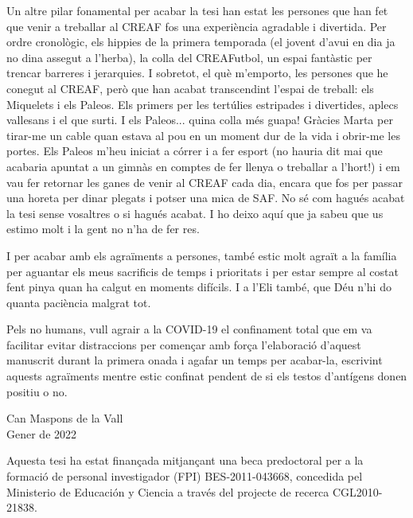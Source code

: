 \documentclass[12pt,a4paper,twoside,fleqn]{memoir}
\begin{document}
Un altre pilar fonamental per acabar la tesi han estat les persones que han fet
que venir a treballar al CREAF fos una experiència agradable i divertida. Per
ordre cronològic, els hippies de la primera temporada (el jovent d'avui en dia
ja no dina assegut a l'herba), la colla del CREAFutbol, un espai fantàstic per
trencar barreres i jerarquies. I sobretot, el què m'emporto, les persones que he
conegut al CREAF, però que han acabat transcendint l'espai de treball: els
Miquelets i els Paleos. Els primers per les tertúlies estripades i divertides,
aplecs vallesans i el que surti. I els Paleos... quina colla més guapa! Gràcies
Marta per tirar-me un cable quan estava al pou en un moment dur de la vida i
obrir-me les portes. Els Paleos m'heu iniciat a córrer i a fer esport (no hauria
dit mai que acabaria apuntat a un gimnàs en comptes de fer llenya o treballar a
l'hort!) i em vau fer retornar les ganes de venir al CREAF cada dia, encara que
fos per passar una horeta per dinar plegats i potser una mica de SAF. No sé com
hagués acabat la tesi sense vosaltres o si hagués acabat. I ho deixo aquí que ja
sabeu que us estimo molt i la gent no n'ha de fer res.

I per acabar amb els agraïments a persones, també estic molt agraït a la família
per aguantar els meus sacrificis de temps i prioritats i per estar sempre al
costat fent pinya quan ha calgut en moments difícils. I a l'Eli també, que Déu
n'hi do quanta paciència malgrat tot.

Pels no humans, vull agrair a la COVID-19 el confinament total que em va
facilitar evitar distraccions per començar amb força l'elaboració d'aquest
manuscrit durant la primera onada i agafar un temps per acabar-la, escrivint
aquests agraïments mentre estic confinat pendent de si els testos d'antígens
donen positiu o no.


\hfill

\begin{flushright}
Can Maspons de la Vall\\
Gener de 2022
\end{flushright}

\vspace*{\fill}
\hrulefill

Aquesta tesi ha estat finançada mitjançant una beca predoctoral per a la
formació de personal investigador (FPI) BES-2011-043668, concedida pel
Ministerio de Educación y Ciencia a través del projecte de recerca
CGL2010-21838.
\end{document}
